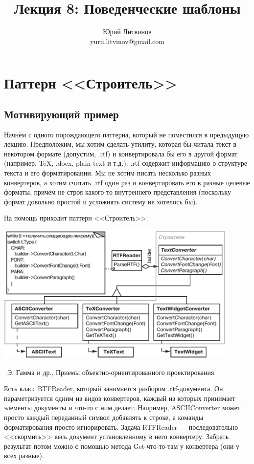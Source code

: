 \documentclass[a5paper]{article}
\title{Лекция 8: Поведенческие шаблоны}
\author{Юрий Литвинов\\\small{yurii.litvinov@gmail.com}}
\date{}
\newcommand{\attribution}[1] {
    \vspace{-5mm}\begin{flushright}\begin{scriptsize}%
    {\textcopyright\, #1}\end{scriptsize}\end{flushright}
}
\begin{document}
\maketitle
\thispagestyle{empty}

\section{Паттерн <<Строитель>>}

\subsection{Мотивирующий пример}

Начнём с одного порождающего паттерна, который не поместился в предыдущую лекцию. Предположим, мы хотим сделать утилиту, которая бы читала текст в некотором формате (допустим, .rtf) и конвертировала бы его в другой формат (например, TeX, .docx, plain text и т.д.). .rtf содержит информацию о структуре текста и его форматировании. Мы не хотим писать несколько разных конвертеров, а хотим считать .rtf один раз и конвертировать его в разные целевые форматы, причём не строя какого-то внутреннего представления (поскольку формат довольно простой и усложнять систему не хотелось бы).

На помощь приходит паттерн <<Строитель>>:

\begin{center}
    \includegraphics[width=0.9\textwidth]{textConverter.png}
    \attribution{Э. Гамма и др., Приемы объектно-ориентированного проектирования}
\end{center}

Есть класс RTFReader, который занимается разбором .rtf-документа. Он параметризуется одним из видов конвертеров, каждый из которых принимает элементы документы и что-то с ним делает. Например, ASCIIConverter может просто каждый переданный символ добавлять к строке, а команды форматирования просто игнорировать. Задача RTFReader --- последовательно <<скормить>> весь документ установленному в него конвертеру. Забрать результат потом можно с помощью метода Get-что-то-там у конвертера (они у всех разные).
\end{document}
